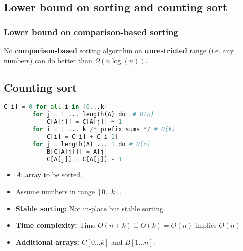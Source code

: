 \subsection{Lower bound on sorting and counting sort}
    \subsubsection{Lower bound on comparison-based sorting}
    \begin{definition}
        No \textbf{comparison-based} sorting algorithm on \textbf{unrestricted} range (i.e. any numbers) can do better than $\Omega(n\log(n))$.    
    \end{definition}

\subsection{Counting sort}
\begin{definition}
    \begin{lstlisting}[language=Python, caption={Counting Sort Pseudocode}]
        C[i] = 0 for all i in [0...k]
        for j = 1 ... length(A) do  # O(n)
            C[A[j]] = C[A[j]] + 1
        for i = 1 ... k /* prefix sums */ # O(k)
            C[i] = C[i] + C[i-1]
        for j = length(A) ... 1 do # O(n)
            B[C[A[j]]] = A[j]
            C[A[j]] = C[A[j]] - 1 
    \end{lstlisting}
    \begin{itemize}
        \item $A$: array to be sorted. 
        \item Assume numbers in range $[0...k]$.
        \item \textbf{Stable sorting:} Not in-place but stable sorting. 
        \item \textbf{Time complexity:} Time $O(n+k)$ if $O(k) = O(n)$ implies $O(n)$
        \item \textbf{Additional arrays:} $C [0\ldots k]$ and $B [1 \ldots n]$.
    \end{itemize}
\end{definition}

